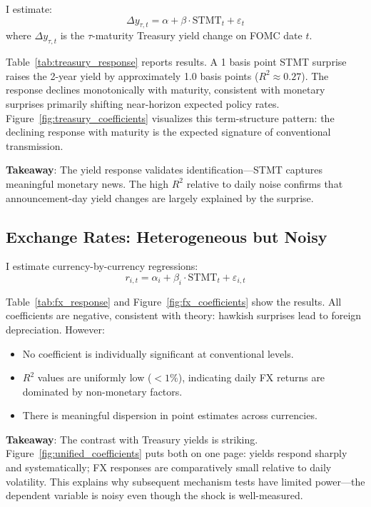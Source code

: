 \documentclass[12pt]{article}
\begin{document}
I estimate:
\begin{equation}
\Delta y_{\tau,t} = \alpha + \beta \cdot \text{STMT}_t + \varepsilon_t
\end{equation}
where $\Delta y_{\tau,t}$ is the $\tau$-maturity Treasury yield change on FOMC date $t$.

Table~\ref{tab:treasury_response} reports results. A 1 basis point STMT surprise raises the 2-year yield by approximately 1.0 basis points ($R^2 \approx 0.27$). The response declines monotonically with maturity, consistent with monetary surprises primarily shifting near-horizon expected policy rates. Figure~\ref{fig:treasury_coefficients} visualizes this term-structure pattern: the declining response with maturity is the expected signature of conventional transmission.

\textbf{Takeaway}: The yield response validates identification---STMT captures meaningful monetary news. The high $R^2$ relative to daily noise confirms that announcement-day yield changes are largely explained by the surprise.

\subsection{Exchange Rates: Heterogeneous but Noisy}

I estimate currency-by-currency regressions:
\begin{equation}
r_{i,t} = \alpha_i + \beta_i \cdot \text{STMT}_t + \varepsilon_{i,t}
\end{equation}

Table~\ref{tab:fx_response} and Figure~\ref{fig:fx_coefficients} show the results. All coefficients are negative, consistent with theory: hawkish surprises lead to foreign depreciation. However:
\begin{itemize}
    \item No coefficient is individually significant at conventional levels.
    \item $R^2$ values are uniformly low ($< 1\%$), indicating daily FX returns are dominated by non-monetary factors.
    \item There is meaningful dispersion in point estimates across currencies.
\end{itemize}

\textbf{Takeaway}: The contrast with Treasury yields is striking. Figure~\ref{fig:unified_coefficients} puts both on one page: yields respond sharply and systematically; FX responses are comparatively small relative to daily volatility. This explains why subsequent mechanism tests have limited power---the dependent variable is noisy even though the shock is well-measured.
\end{document}
